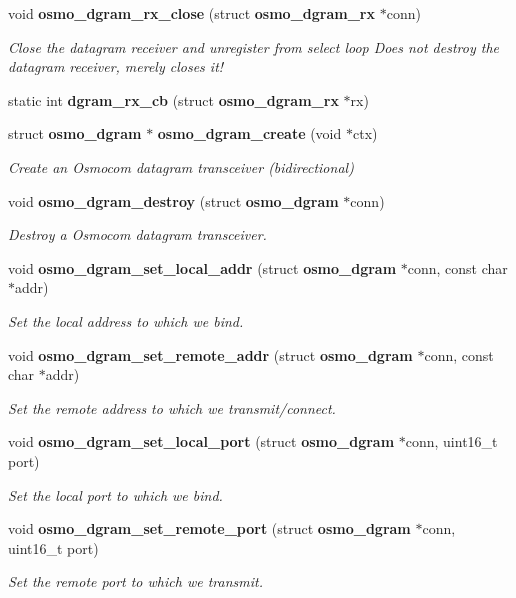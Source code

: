 \begin{DoxyCompactItemize}
void {\bf osmo\+\_\+dgram\+\_\+rx\+\_\+close} (struct {\bf osmo\+\_\+dgram\+\_\+rx} $\ast$conn)
\begin{DoxyCompactList}\small\item\em Close the datagram receiver and unregister from select loop Does not destroy the datagram receiver, merely closes it! \end{DoxyCompactList}\item 
static int {\bfseries dgram\+\_\+rx\+\_\+cb} (struct {\bf osmo\+\_\+dgram\+\_\+rx} $\ast$rx)
\item 
struct {\bf osmo\+\_\+dgram} $\ast$ {\bf osmo\+\_\+dgram\+\_\+create} (void $\ast$ctx)
\begin{DoxyCompactList}\small\item\em Create an Osmocom datagram transceiver (bidirectional) \end{DoxyCompactList}\item 
void {\bf osmo\+\_\+dgram\+\_\+destroy} (struct {\bf osmo\+\_\+dgram} $\ast$conn)
\begin{DoxyCompactList}\small\item\em Destroy a Osmocom datagram transceiver. \end{DoxyCompactList}\item 
void {\bf osmo\+\_\+dgram\+\_\+set\+\_\+local\+\_\+addr} (struct {\bf osmo\+\_\+dgram} $\ast$conn, const char $\ast$addr)
\begin{DoxyCompactList}\small\item\em Set the local address to which we bind. \end{DoxyCompactList}\item 
void {\bf osmo\+\_\+dgram\+\_\+set\+\_\+remote\+\_\+addr} (struct {\bf osmo\+\_\+dgram} $\ast$conn, const char $\ast$addr)
\begin{DoxyCompactList}\small\item\em Set the remote address to which we transmit/connect. \end{DoxyCompactList}\item 
void {\bf osmo\+\_\+dgram\+\_\+set\+\_\+local\+\_\+port} (struct {\bf osmo\+\_\+dgram} $\ast$conn, uint16\+\_\+t port)
\begin{DoxyCompactList}\small\item\em Set the local port to which we bind. \end{DoxyCompactList}\item 
void {\bf osmo\+\_\+dgram\+\_\+set\+\_\+remote\+\_\+port} (struct {\bf osmo\+\_\+dgram} $\ast$conn, uint16\+\_\+t port)
\begin{DoxyCompactList}\small\item\em Set the remote port to which we transmit. \end{DoxyCompactList}\item 

\end{DoxyCompactItemize}
